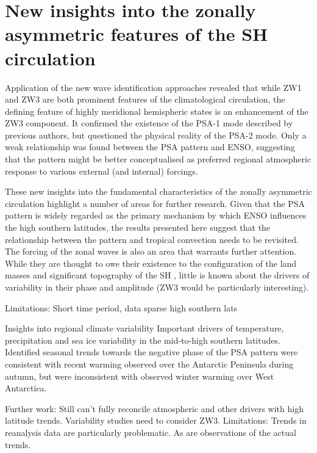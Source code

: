 

\section{New insights into the zonally asymmetric features of the SH circulation}

Application of the new wave identification approaches revealed that while ZW1 and ZW3 are both prominent features of the climatological circulation, the defining feature of highly meridional hemispheric states is an enhancement of the ZW3 component. It confirmed the existence of the PSA-1 mode described by previous authors, but questioned the physical reality of the PSA-2 mode. Only a weak relationship was found between the PSA pattern and ENSO, suggesting that the pattern might be better conceptualised as preferred regional atmospheric response to various external (and internal) forcings. 

These new insights into the fundamental characteristics of the zonally asymmetric circulation highlight a number of areas for further research. Given that the PSA pattern is widely regarded as the primary mechanism by which ENSO influences the high southern latitudes, the results presented here suggest that the relationship between the pattern and tropical convection needs to be revisited. The forcing of the zonal waves is also an area that warrants further attention. While they are thought to owe their existence to the configuration of the land masses and significant topography of the SH \citep{Baines1989}, little is known about the drivers of variability in their phase and amplitude (ZW3 would be particularly interesting). 

Limitations: Short time period, data sparse high southern lats


Insights into regional climate variability
Important drivers of temperature, precipitation and sea ice variability in the mid-to-high southern latitudes. 
Identified seasonal trends towards the negative phase of the PSA pattern were consistent with recent warming observed over the Antarctic Peninsula during autumn, but were inconsistent with observed winter warming over West Antarctica. 

Further work: Still can't fully reconcile atmospheric and other drivers with high latitude trends. Variability studies need to consider ZW3.
Limitations: Trends in reanalysis data are particularly problematic. As are observations of the actual trends.


